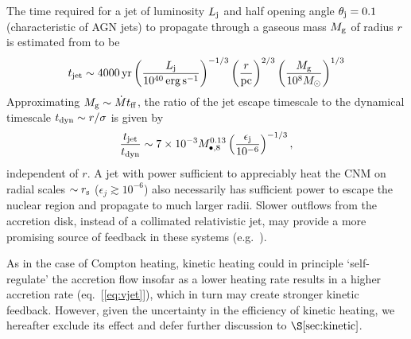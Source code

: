 \documentclass[usenatbib,fleqn]{mn2e}
\begin{document}
The time required for a jet of luminosity $L_{\rm
  j}$ and half opening angle $\theta_{\rm j} = 0.1$ (characteristic of
AGN jets) to propagate through a gaseous mass $M_{\rm g}$ of radius $r$ is estimated from \citet{Bromberg+11} to be 
\begin{eqnarray}
t_{\rm jet} \sim 4000\,{\rm yr}\left(\frac{{L}_{\rm j}}{10^{40}\,\rm erg\,s^{-1}}\right)^{-1/3}\left(\frac{r}{\rm pc}\right)^{2/3}\left(\frac{M_{\rm g}}{10^{8}M_{\odot}}\right)^{1/3} 
\end{eqnarray}
Approximating $M_{\rm g} \sim \dot{M}t_{\rm ff}$, the ratio of the jet escape timescale to the dynamical timescale $t_{\rm dyn} \sim r/\sigma$ is given by
\begin{equation}
\frac{t_{\rm jet}}{t_{\rm dyn}} \sim 7\times 10^{-3}M_{\bullet,8}^{0.13}\left(\frac{\epsilon_{\rm j}}{10^{-6}}\right)^{-1/3},
\end{equation}
independent of $r$.  A jet with power sufficient to appreciably heat
the CNM on radial scales $\sim r_{\rm s}$ ($\epsilon_{j} \gtrsim
10^{-6}$) also necessarily has sufficient power to escape the nuclear
region and propagate to much larger radii.  Slower outflows from the
accretion disk, instead of a collimated relativistic jet, may provide
a more promising source of feedback in these systems
(e.g.~\citealt{Li+13}).

As in the case of Compton heating, kinetic heating could in principle
`self-regulate' the accretion flow insofar as a lower heating rate
results in a higher accretion rate (eq.~[\ref{eq:vjet}]), which in
turn may create stronger kinetic feedback.  However, given the uncertainty
in the efficiency of kinetic heating, we hereafter exclude its effect and defer further discussion
to $\S\ref{sec:kinetic}$.
\end{document}
